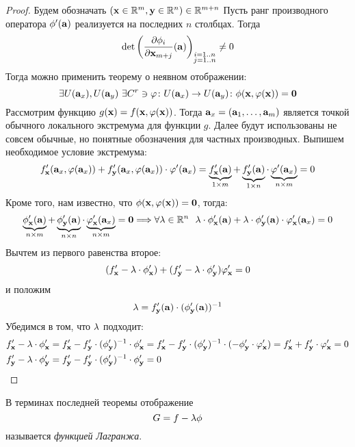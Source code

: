 \begin{proof}
    Будем обозначать $(\mathbf{x} \in \mathbb{R}^m, \mathbf{y} \in \mathbb{R}^n) \in \mathbb{R}^{m + n}$
    Пусть ранг производного оператора $\phi'(\mathbf{a})$ реализуется на
    последних $n$ столбцах. Тогда
\[
    \det{\left( \dfrac{\partial \phi_i}{\partial \mathbf{x}_{m + j}}(\mathbf{a}) \right)}_{\substack{i = 1..n
    \\ j = 1..n}} \neq 0
\]
    Тогда можно применить теорему о неявном отображении:
\[
    \exists U(\mathbf{a}_x), U(\mathbf{a}_y)~ \exists C^r \ni \varphi \colon U(\mathbf{a}_x) \to U(\mathbf{a}_y)
    \colon \phi(\mathbf{x}, \varphi(\mathbf{x})) = \mathbf{0}
\]
    Рассмотрим функцию $g(\mathbf{x}) = f(\mathbf{x}, \varphi(\mathbf{x}))$. Тогда $\mathbf{a}_x = (\mathbf{a}_1, \ldots, \mathbf{a}_m)$
    является точкой обычного локального экстремума для функции $g$. Далее будут
    использованы не совсем обычные, но понятные обозначения для частных производных.
    Выпишем необходимое условие экстремума:
\[
    f'_{\mathbf{x}}(\mathbf{a}_x, \varphi(\mathbf{a}_x)) + f'_{\mathbf{y}}(\mathbf{a}_x, \varphi(\mathbf{a}_x)) \cdot \varphi'(\mathbf{a}_x) =
    \underbrace{f'_{\mathbf{x}}(\mathbf{a})}_{1 \times m} + \underbrace{f'_{\mathbf{y}}(\mathbf{a})}_{1 \times n}
    \cdot \underbrace{\varphi'(\mathbf{a}_x)}_{n \times m} = 0
\]
    Кроме того, нам известно, что $\phi(\mathbf{x}, \varphi(\mathbf{x})) = \mathbf{0}$, тогда:
\[
    \underbrace{\phi'_{\mathbf{x}}(\mathbf{a})}_{n \times m} + \underbrace{\phi'_{\mathbf{y}}(\mathbf{a})}_{n \times n}
    \cdot \underbrace{\varphi'_{\mathbf{x}}(\mathbf{a}_x)}_{n \times m} = \mathbf{0} \Longrightarrow
    \forall \lambda \in \mathbb{R}^n~~ \lambda \cdot \phi'_{\mathbf{x}}(\mathbf{a}) + \lambda \cdot \phi'_{\mathbf{y}}(\mathbf{a}) \cdot
    \varphi'_{\mathbf{x}}(\mathbf{a}_x) = 0
\]
    Вычтем из первого равенства второе:
\[
    (f'_{\mathbf{x}} - \lambda \cdot \phi'_{\mathbf{x}}) + (f'_{\mathbf{y}} - \lambda \cdot \phi'_{\mathbf{y}}) \varphi'_{\mathbf{x}} = 0
\]
    и положим
\[
    \lambda = f'_{\mathbf{y}}(\mathbf{a}) \cdot (\phi'_{\mathbf{y}}(\mathbf{a}))^{-1}
\]
    Убедимся в том, что $\lambda$ подходит:
\begin{align*}
    f'_{\mathbf{x}} - \lambda \cdot \phi'_{\mathbf{x}} &= f'_{\mathbf{x}} - f'_{\mathbf{y}} \cdot (\phi'_{\mathbf{y}})^{-1}
    \cdot \phi'_{\mathbf{x}} = f'_{\mathbf{x}} - f'_{\mathbf{y}} \cdot (\phi'_{\mathbf{y}})^{-1} \cdot (-\phi'_{\mathbf{y}}
    \cdot \varphi'_{\mathbf{x}}) = f'_{\mathbf{x}} + f'_{\mathbf{y}} \cdot \varphi'_{\mathbf{x}} = 0 \\
    f'_{\mathbf{y}} - \lambda \cdot \phi'_{\mathbf{y}} &= f'_{\mathbf{y}} - f'_{\mathbf{y}} \cdot (\phi'_{\mathbf{y}})^{-1}
    \cdot \phi'_{\mathbf{y}} = 0
\end{align*}
\end{proof}

\begin{definition}
    В терминах последней теоремы отображение
\[
    G = f - \lambda \phi
\]
    называется \textit{функцией Лагранжа}.
\end{definition}

